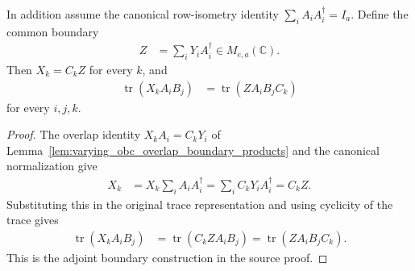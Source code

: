 \begin{lemma}
    \label{lem:varying_obc_three_site_reconstruction}
    \leanok
    In addition assume the canonical row-isometry identity
    $\sum_iA_iA_i^\dagger=I_a$. Define the common boundary
    \begin{align}
        Z & =\sum_iY_iA_i^\dagger\in M_{e,a}(\mathbb C).
    \end{align}
    Then $X_k=C_kZ$ for every $k$, and
    \begin{align}
        \operatorname{tr}(X_kA_iB_j) & =\operatorname{tr}(ZA_iB_jC_k)
    \end{align}
    for every $i,j,k$.
\end{lemma}
\begin{proof}\leanok
    The overlap identity $X_kA_i=C_kY_i$ of
    Lemma~\ref{lem:varying_obc_overlap_boundary_products} and the canonical
    normalization give
    \begin{align}
        X_k & =X_k\sum_iA_iA_i^\dagger
        =\sum_iC_kY_iA_i^\dagger=C_kZ.
    \end{align}
    Substituting this in the original trace representation and using
    cyclicity of the trace gives
    \begin{align}
        \operatorname{tr}(X_kA_iB_j) & =\operatorname{tr}(C_kZA_iB_j)
        =\operatorname{tr}(ZA_iB_jC_k).
    \end{align}
    This is the adjoint boundary construction in the source proof.
\end{proof}


